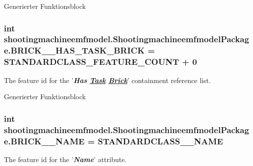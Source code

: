 Generierter Funktionsblock  \hypertarget{interfaceshootingmachineemfmodel_1_1_shootingmachineemfmodel_package_a66883613c7e0d6c9ec3a7249b53ed40f}{
\subsubsection[{B\-R\-I\-C\-K\-\_\-\-\_\-\-H\-A\-S\-\_\-\-T\-A\-S\-K\-\_\-\-B\-R\-I\-C\-K}]{\setlength{\rightskip}{0pt plus 5cm}int shootingmachineemfmodel.\-Shootingmachineemfmodel\-Package.\-B\-R\-I\-C\-K\-\_\-\-\_\-\-H\-A\-S\-\_\-\-T\-A\-S\-K\-\_\-\-B\-R\-I\-C\-K = {\bf S\-T\-A\-N\-D\-A\-R\-D\-C\-L\-A\-S\-S\-\_\-\-F\-E\-A\-T\-U\-R\-E\-\_\-\-C\-O\-U\-N\-T} + 0}}\label{interfaceshootingmachineemfmodel_1_1_shootingmachineemfmodel_package_a66883613c7e0d6c9ec3a7249b53ed40f}
The feature id for the '{\itshape {\bfseries Has \hyperlink{interfaceshootingmachineemfmodel_1_1_task}{Task} \hyperlink{interfaceshootingmachineemfmodel_1_1_brick}{Brick}}}' containment reference list.

Generierter Funktionsblock  \hypertarget{interfaceshootingmachineemfmodel_1_1_shootingmachineemfmodel_package_af57dd2f3fc0b0bd1cc3df361ac3c1475}{
\subsubsection[{B\-R\-I\-C\-K\-\_\-\-\_\-\-N\-A\-M\-E}]{\setlength{\rightskip}{0pt plus 5cm}int shootingmachineemfmodel.\-Shootingmachineemfmodel\-Package.\-B\-R\-I\-C\-K\-\_\-\-\_\-\-N\-A\-M\-E = {\bf S\-T\-A\-N\-D\-A\-R\-D\-C\-L\-A\-S\-S\-\_\-\-\_\-\-N\-A\-M\-E}}}\label{interfaceshootingmachineemfmodel_1_1_shootingmachineemfmodel_package_af57dd2f3fc0b0bd1cc3df361ac3c1475}
The feature id for the '{\itshape {\bfseries Name}}' attribute.

